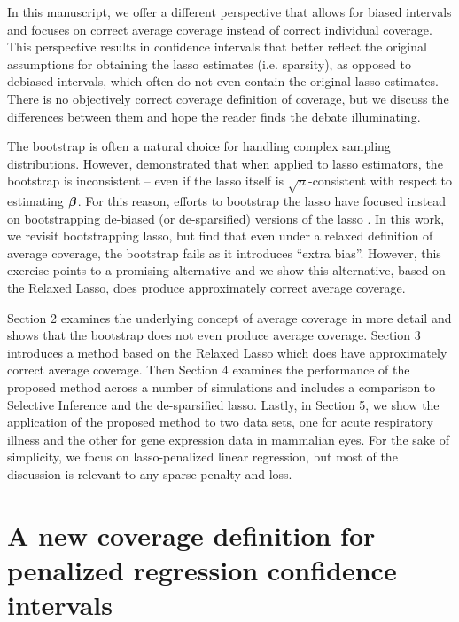 In this manuscript, we offer a different perspective that allows for biased intervals and focuses on correct average coverage instead of correct individual coverage. This perspective results in confidence intervals that better reflect the original assumptions for obtaining the lasso estimates (i.e. sparsity), as opposed to debiased intervals, which often do not even contain the original lasso estimates. There is no objectively correct coverage definition of coverage, but we discuss the differences between them and hope the reader finds the debate illuminating. 

The bootstrap is often a natural choice for handling complex sampling distributions. However, \cite{Chatterjee2010} demonstrated that when applied to lasso estimators, the bootstrap is inconsistent -- even if the lasso itself is $\sqrt{n}$-consistent with respect to estimating $\boldsymbol{\beta}$. For this reason, efforts to bootstrap the lasso have focused instead on bootstrapping de-biased (or de-sparsified) versions of the lasso \citep{Dezeure2017}. In this work, we revisit bootstrapping lasso, but find that even under a relaxed definition of average coverage, the bootstrap fails as it introduces ``extra bias''. However, this exercise points to a promising alternative and we show this alternative, based on the Relaxed Lasso, does produce approximately correct average coverage.


Section 2 examines the underlying concept of average coverage in more detail and shows that the bootstrap does not even produce average coverage. Section 3 introduces a method based on the Relaxed Lasso which does have approximately correct average coverage. Then Section 4 examines the performance of the proposed method across a number of simulations and includes a comparison to Selective Inference and the de-sparsified lasso. Lastly, in Section 5, we show the application of the proposed method to two data sets, one for acute respiratory illness and the other for gene expression data in mammalian eyes. For the sake of simplicity, we focus on lasso-penalized linear regression, but most of the discussion is relevant to any sparse penalty and loss.

\section{A new coverage definition for penalized regression confidence intervals}
\label{Sec:difficulties}

